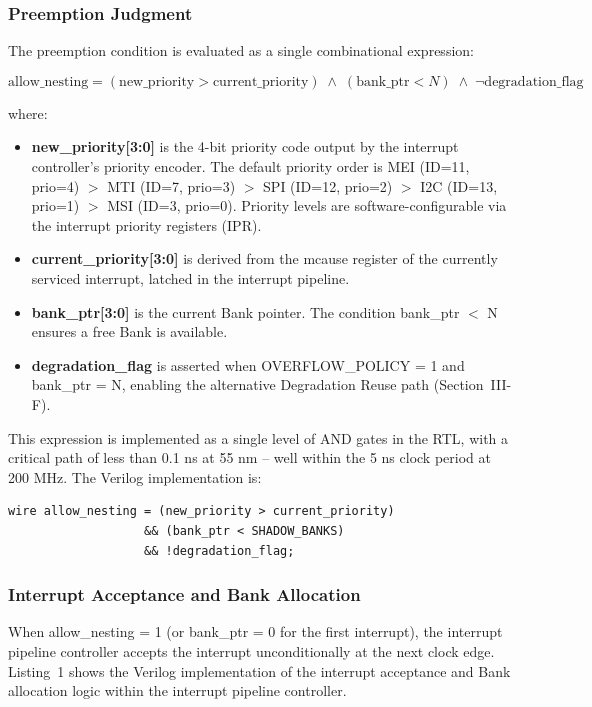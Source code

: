 \documentclass[letterpaper,journal]{IEEEtran}
\begin{document}
\subsubsection{Preemption Judgment}

The preemption condition is evaluated as a single combinational expression:

\begin{equation}
\text{allow\_nesting} = (\text{new\_priority} > \text{current\_priority}) \;\land\; (\text{bank\_ptr} < N) \;\land\; \lnot\text{degradation\_flag}
\label{eq:preempt}
\end{equation}

where:
\begin{itemize}
\item \textbf{new\_priority[3:0]} is the 4-bit priority code output by the interrupt controller's priority encoder. The default priority order is MEI (ID=11, prio=4) $>$ MTI (ID=7, prio=3) $>$ SPI (ID=12, prio=2) $>$ I2C (ID=13, prio=1) $>$ MSI (ID=3, prio=0). Priority levels are software-configurable via the interrupt priority registers (IPR).
\item \textbf{current\_priority[3:0]} is derived from the mcause register of the currently serviced interrupt, latched in the interrupt pipeline.
\item \textbf{bank\_ptr[3:0]} is the current Bank pointer. The condition bank\_ptr $<$ N ensures a free Bank is available.
\item \textbf{degradation\_flag} is asserted when OVERFLOW\_POLICY = 1 and bank\_ptr = N, enabling the alternative Degradation Reuse path (Section~III-F).
\end{itemize}

This expression is implemented as a single level of AND gates in the RTL, with a critical path of less than 0.1 ns at 55 nm -- well within the 5 ns clock period at 200 MHz.
The Verilog implementation is:

\begin{verbatim}
wire allow_nesting = (new_priority > current_priority)
                   && (bank_ptr < SHADOW_BANKS)
                   && !degradation_flag;
\end{verbatim}

\subsubsection{Interrupt Acceptance and Bank Allocation}

When allow\_nesting = 1 (or bank\_ptr = 0 for the first interrupt), the interrupt pipeline controller accepts the interrupt unconditionally at the next clock edge.
Listing~1 shows the Verilog implementation of the interrupt acceptance and Bank allocation logic within the interrupt pipeline controller.
\end{document}
